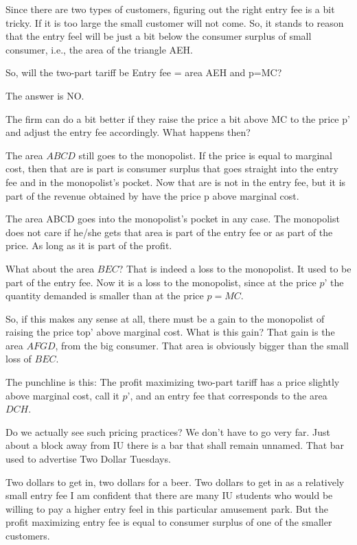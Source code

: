 \documentclass[
]{book}
\begin{document}
Since there are two types of customers, figuring out the right entry fee is a bit tricky. If it is too large the small customer will not come. So, it stands to reason that the entry feel will be just a bit below the consumer surplus of small consumer, i.e., the area of the triangle AEH.

So, will the two-part tariff be Entry fee = area AEH and p=MC?

The answer is NO.

The firm can do a bit better if they raise the price a bit above MC to the price p' and adjust the entry fee accordingly. What happens then?

The area \(ABCD\) still goes to the monopolist. If the price is equal to marginal cost, then that are is part is consumer surplus that goes straight into the entry fee and in the monopolist's pocket. Now that are is not in the entry fee, but it is part of the revenue obtained by have the price p above marginal cost.

The area ABCD goes into the monopolist's pocket in any case. The monopolist does not care if he/she gets that area is part of the entry fee or as part of the price. As long as it is part of the profit.

What about the area \(BEC\)? That is indeed a loss to the monopolist. It used to be part of the entry fee. Now it is a loss to the monopolist, since at the price \(p’\) the quantity demanded is smaller than at the price \(p = MC\).

So, if this makes any sense at all, there must be a gain to the monopolist of raising the price top' above marginal cost. What is this gain? That gain is the area \(AFGD\), from the big consumer. That area is obviously bigger than the small loss of \(BEC\).

The punchline is this: The profit maximizing two-part tariff has a price slightly above marginal cost, call it \(p’\), and an entry fee that corresponds to the area \(DCH\).

Do we actually see such pricing practices? We don't have to go very far. Just about a block away from IU there is a bar that shall remain unnamed. That bar used to advertise
Two Dollar Tuesdays.

Two dollars to get in, two dollars for a beer. Two dollars to get in as a relatively small entry fee I am confident that there are many IU students who would be willing to pay a higher entry feel in this particular amusement park. But the profit maximizing entry fee is equal to consumer surplus of one of the smaller customers.
\end{document}
